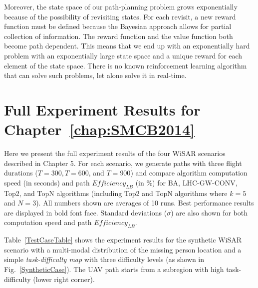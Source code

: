 Moreover, the state space of our path-planning problem grows exponentially because of the possibility of revisiting states. For each revisit, a new reward function must be defined because the Bayesian approach allows for partial collection of information. The reward function and the value function both become path dependent. This means that we end up with an exponentially hard problem with an exponentially large state space and a unique reward for each element of the state space. There is no known reinforcement learning algorithm that can solve such problems, let alone solve it in real-time.


\chapter{Full Experiment Results for Chapter~\ref{chap:SMCB2014}}
\label{chap:result}

Here we present the full experiment results of the four WiSAR scenarios described in Chapter 5. For each scenario, we generate paths with three flight durations ($T=300, T=600$, and $T=900$) and compare algorithm computation speed (in seconds) and path $\mathit{Efficiency_{LB}}$ (in \%) for BA, LHC-GW-CONV, Top2, and TopN algorithms (including Top2 and TopN algorithms where $k=5$ and $N=3$). All numbers shown are averages of 10 runs. Best performance results are displayed in bold font face. Standard deviations ($\sigma$) are also shown for both computation speed and path $\mathit{Efficiency_{LB}}$.


Table~\ref{TestCaseTable} shows the experiment results for the synthetic WiSAR scenario with a multi-modal distribution of the missing person location and a simple \textit{task-difficulty map} with three difficulty levels (as shown in Fig.~\ref{SyntheticCase}). The UAV path starts from a subregion with high task-difficulty (lower right corner).

